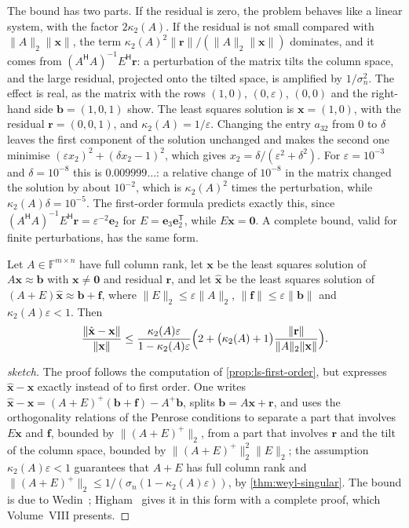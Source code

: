 The bound has two parts. If the residual is zero, the problem behaves like a linear system, with the factor $2\kappa_2(A)$. If the residual is not small compared with $\|A\|_2\|\mathbf x\|$, the term $\kappa_2(A)^2\|\mathbf r\|/(\|A\|_2\|\mathbf x\|)$ dominates, and it comes from $(A^{\mathsf H}A)^{-1}E^{\mathsf H}\mathbf r$: a perturbation of the matrix tilts the column space, and the large residual, projected onto the tilted space, is amplified by $1/\sigma_n^2$. The effect is real, as the matrix with the rows $(1,0)$, $(0,\varepsilon)$, $(0,0)$ and the right-hand side $\mathbf b=(1,0,1)$ show. The least squares solution is $\mathbf x=(1,0)$, with the residual $\mathbf r=(0,0,1)$, and $\kappa_2(A)=1/\varepsilon$. Changing the entry $a_{32}$ from $0$ to $\delta$ leaves the first component of the solution unchanged and makes the second one minimise $(\varepsilon x_2)^2+(\delta x_2-1)^2$, which gives $x_2=\delta/(\varepsilon^2+\delta^2)$. For $\varepsilon=10^{-3}$ and $\delta=10^{-8}$ this is $0.009999\ldots$: a relative change of $10^{-8}$ in the matrix changed the solution by about $10^{-2}$, which is $\kappa_2(A)^2$ times the perturbation, while $\kappa_2(A)\delta=10^{-5}$. The first-order formula predicts exactly this, since $(A^{\mathsf H}A)^{-1}E^{\mathsf H}\mathbf r=\varepsilon^{-2}\mathbf e_2$ for $E=\mathbf e_3\mathbf e_2^{\mathsf T}$, while $E\mathbf x=\mathbf 0$. A complete bound, valid for finite perturbations, has the same form.

\begin{theorem}
\label{thm:ls-sensitivity}
Let $A\in\mathbb F^{m\times n}$ have full column rank, let $\mathbf x$ be the least squares solution of $A\mathbf x\approx\mathbf b$ with $\mathbf x\ne\mathbf 0$ and residual $\mathbf r$, and let $\hat{\mathbf x}$ be the least squares solution of $(A+E)\hat{\mathbf x}\approx\mathbf b+\mathbf f$, where $\|E\|_2\le\varepsilon\|A\|_2$, $\|\mathbf f\|\le\varepsilon\|\mathbf b\|$ and $\kappa_2(A)\varepsilon<1$. Then
\[
\frac{\|\hat{\mathbf x}-\mathbf x\|}{\|\mathbf x\|}\le\frac{\kappa_2(A)\varepsilon}{1-\kappa_2(A)\varepsilon}\Bigl(2+\bigl(\kappa_2(A)+1\bigr)\frac{\|\mathbf r\|}{\|A\|_2\|\mathbf x\|}\Bigr).
\]
\end{theorem}

\begin{proof}[sketch]
The proof follows the computation of \cref{prop:ls-first-order}, but expresses $\hat{\mathbf x}-\mathbf x$ exactly instead of to first order. One writes $\hat{\mathbf x}-\mathbf x=(A+E)^+(\mathbf b+\mathbf f)-A^+\mathbf b$, splits $\mathbf b=A\mathbf x+\mathbf r$, and uses the orthogonality relations of the Penrose conditions to separate a part that involves $E\mathbf x$ and $\mathbf f$, bounded by $\|(A+E)^+\|_2$, from a part that involves $\mathbf r$ and the tilt of the column space, bounded by $\|(A+E)^+\|_2^2\|E\|_2$; the assumption $\kappa_2(A)\varepsilon<1$ guarantees that $A+E$ has full column rank and $\|(A+E)^+\|_2\le1/(\sigma_n(1-\kappa_2(A)\varepsilon))$, by \cref{thm:weyl-singular}. The bound is due to Wedin~\cite{wedin1973}; Higham~\cite[Thm.~20.1]{higham2002accuracy} gives it in this form with a complete proof, which Volume~VIII presents.
\end{proof}

